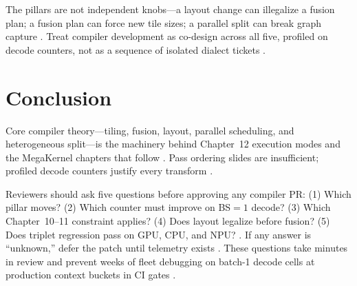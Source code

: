 The pillars are not independent knobs---a layout change can illegalize a fusion plan; a fusion plan can force new tile sizes; a parallel split can break graph capture \citep{yirage2026,chen2020compilerbasedhardw,memoryfloor2026,nvidia2024cudagraphs,patel2025llminference,taxbreak2026,dao2022flashattention,semianalysis2024tma,amd2024xdna,amd2024aie,dlbook,kwon2023vllm,liu2024deepseekv3,dao2023flashdecoding,nvidia2022hopper}. Treat compiler development as co-design across all five, profiled on decode counters, not as a sequence of isolated dialect tickets \citep{patel2025llminference,taxbreak2026,memoryfloor2026,yirage2026,chen2020compilerbasedhardw,dlbook}.

\section{Conclusion}
\label{sec:ch13_conclusion}

Core compiler theory---tiling, fusion, layout, parallel scheduling, and heterogeneous split---is the machinery behind Chapter~12 execution modes and the MegaKernel chapters that follow \citep{yirage2026,chen2020compilerbasedhardw,taxbreak2026,memoryfloor2026,patel2025llminference,amd2024xdna,amd2024aie,dao2022flashattention,dao2023flashdecoding,kwon2023vllm,liu2024deepseekv3,nvidia2022hopper,semianalysis2024tma,nvidia2024cudagraphs,dlbook}. Pass ordering slides are insufficient; profiled decode counters justify every transform \citep{patel2025llminference,taxbreak2026,memoryfloor2026,semianalysis2024tma,yirage2026,chen2020compilerbasedhardw,amd2024xdna,amd2024aie,dao2022flashattention,dao2023flashdecoding,kwon2023vllm,liu2024deepseekv3,nvidia2022hopper,nvidia2024cudagraphs,dlbook}.

Reviewers should ask five questions before approving any compiler PR: (1) Which pillar moves? (2) Which counter must improve on BS${=}1$ decode? (3) Which Chapter~10--11 constraint applies? (4) Does layout legalize before fusion? (5) Does triplet regression pass on GPU, CPU, and NPU? \citep{yirage2026,chen2020compilerbasedhardw,patel2025llminference,taxbreak2026,memoryfloor2026,amd2024xdna,amd2024aie,dlbook}. If any answer is ``unknown,'' defer the patch until telemetry exists \citep{patel2025llminference,taxbreak2026,memoryfloor2026}. These questions take minutes in review and prevent weeks of fleet debugging on batch-1 decode cells at production context buckets in CI gates \citep{yirage2026,chen2020compilerbasedhardw,patel2025llminference,memoryfloor2026,taxbreak2026,dlbook}.

